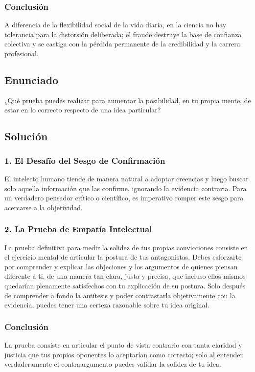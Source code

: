 \documentclass[12pt, a4paper]{article}
\begin{document}
\subsubsection*{Conclusión}
A diferencia de la flexibilidad social de la vida diaria, en la ciencia no hay tolerancia para la distorsión deliberada; el fraude destruye la base de confianza colectiva y se castiga con la pérdida permanente de la credibilidad y la carrera profesional.

\newpage

\subsection*{Enunciado}
¿Qué prueba puedes realizar para aumentar la posibilidad, en tu propia mente, de estar en lo correcto respecto de una idea particular?

\subsection*{Solución}

\subsubsection*{1. El Desafío del Sesgo de Confirmación}
El intelecto humano tiende de manera natural a adoptar creencias y luego buscar solo aquella información que las confirme, ignorando la evidencia contraria. Para un verdadero pensador crítico o científico, es imperativo romper este sesgo para acercarse a la objetividad.

\subsubsection*{2. La Prueba de Empatía Intelectual}
La prueba definitiva para medir la solidez de tus propias convicciones consiste en el ejercicio mental de articular la postura de tus antagonistas. Debes esforzarte por comprender y explicar las objeciones y los argumentos de quienes piensan diferente a ti, de una manera tan clara, justa y precisa, que incluso ellos mismos quedarían plenamente satisfechos con tu explicación de su postura. Solo después de comprender a fondo la antítesis y poder contrastarla objetivamente con la evidencia, puedes tener una certeza razonable sobre tu idea original.

\subsubsection*{Conclusión}
La prueba consiste en articular el punto de vista contrario con tanta claridad y justicia que tus propios oponentes lo aceptarían como correcto; solo al entender verdaderamente el contraargumento puedes validar la solidez de tu idea.
\end{document}
